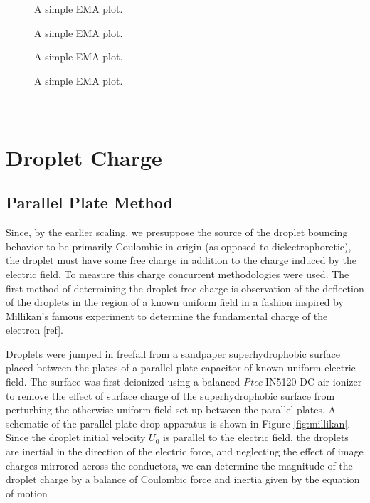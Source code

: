 \documentclass[10pt,a4paper]{article}
\begin{document}
\begin{figure}[htb]
    \centering
    
    \caption{A simple EMA plot.\label{fig:series}}
\end{figure}

\begin{figure}[htb]
    \centering
    \resizebox{14cm}{!}{}
    \caption{A simple EMA plot.\label{fig:forces}}
\end{figure}

\begin{figure}[htb]
    \centering
    
    \caption{A simple EMA plot.\label{fig:contact}}
\end{figure}

\begin{figure}[htb]
    \centering
    
    \caption{A simple EMA plot.\label{fig:restitution}}
\end{figure}

\newpage
\appendix

\section{\\Droplet Charge} \label{sec.drop_charge}
\subsection*{Parallel Plate Method}
Since, by the earlier scaling, we presuppose the source of the droplet bouncing behavior to be primarily Coulombic in origin (as opposed to dielectrophoretic), the droplet must have some free charge in addition to the charge induced by the electric field. To measure this charge concurrent methodologies were used. The first method of determining the droplet free charge is observation of the deflection of the droplets in the region of a known uniform field in a fashion inspired by Millikan's famous experiment to determine the fundamental charge of the electron [ref].

Droplets were jumped in freefall from a sandpaper superhydrophobic surface placed between the plates of a parallel plate capacitor of known uniform electric field. The surface was first deionized using a balanced \emph{Ptec} IN5120 DC air-ionizer to remove the effect of surface charge of the superhydrophobic surface from perturbing the otherwise uniform field set up between the parallel plates. A schematic of the parallel plate drop apparatus is shown in Figure \ref{fig:millikan}. Since the droplet initial velocity $U_0$ is parallel to the electric field, the droplets are inertial in the direction of the electric force, and neglecting the effect of image charges mirrored across the conductors, we can determine the magnitude of the droplet charge by a balance of Coulombic force and inertia given by the equation of motion
\end{document}
